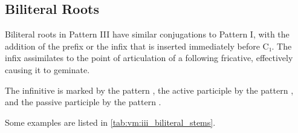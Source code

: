 \documentclass[grammar]{subfiles}
\begin{document}
\subsection{Biliteral Roots}
\label{ssec:vm:iii_biliteral}

Biliteral roots in Pattern III have similar conjugations to Pattern I, with the
addition of the prefix  or the infix  that is inserted immediately before
C₁.  The infix assimilates to the point of articulation of a following
fricative, effectively causing it to geminate. 

The infinitive is marked by the pattern , the active participle by the
pattern , and the passive participle by the pattern .  

Some examples are listed in \cref{tab:vm:iii_biliteral_stems}. 

\begin{table}[h!]\small\capstart
  \centering
  \\
  \caption{Pattern III biliteral stems \label{tab:vm:iii_biliteral_stems}}
\end{table}
\end{document}
